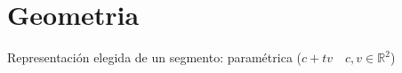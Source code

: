 \section{Geometria}


Representación elegida de un segmento: paramétrica ($c + tv \quad c, v \in \mathds{R}^2$)

